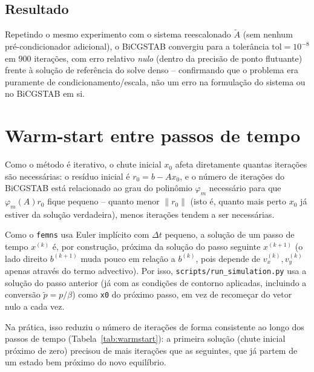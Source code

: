 \documentclass[11pt,a4paper]{article}
\begin{document}
\subsection{Resultado}

Repetindo o mesmo experimento com o sistema reescalonado $\tilde A$
(sem nenhum pré-condicionador adicional), o BiCGSTAB convergiu para a
tolerância $\text{tol}=10^{-8}$ em $900$ iterações, com erro relativo
\emph{nulo} (dentro da precisão de ponto flutuante) frente à solução
de referência do solve denso -- confirmando que o problema era
puramente de condicionamento/escala, não um erro na formulação do
sistema ou no BiCGSTAB em si.

\section{Warm-start entre passos de tempo}

Como o método é iterativo, o chute inicial $x_0$ afeta diretamente
quantas iterações são necessárias: o resíduo inicial é $r_0 = b -
Ax_0$, e o número de iterações do BiCGSTAB está relacionado ao grau do
polinômio $\varphi_m$ necessário para que $\varphi_m(A) r_0$ fique
pequeno -- quanto menor $\|r_0\|$ (isto é, quanto mais perto $x_0$ já
estiver da solução verdadeira), menos iterações tendem a ser
necessárias.

Como o \texttt{femns} usa Euler implícito com $\Delta t$ pequeno, a
solução de um passo de tempo $x^{(k)}$ é, por construção, próxima da
solução do passo seguinte $x^{(k+1)}$ (o lado direito $b^{(k+1)}$
muda pouco em relação a $b^{(k)}$, pois depende de $v_x^{(k)},
v_y^{(k)}$ apenas através do termo advectivo). Por isso,
\texttt{scripts/run\_simulation.py} usa a solução do passo anterior
(já com as condições de contorno aplicadas, incluindo a conversão
$\tilde p = p/\beta$) como \texttt{x0} do próximo passo, em vez de
recomeçar do vetor nulo a cada vez.

Na prática, isso reduziu o número de iterações de forma consistente ao
longo dos passos de tempo (Tabela~\ref{tab:warmstart}): a primeira
solução (chute inicial próximo de zero) precisou de mais iterações que
as seguintes, que já partem de um estado bem próximo do novo
equilíbrio.
\end{document}
